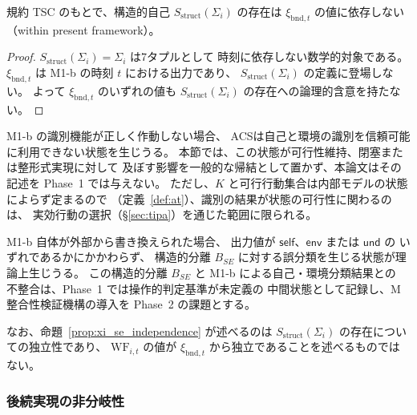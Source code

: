 \begin{proposition}
\label{prop:xi_se_independence}
規約 TSC のもとで、構造的自己
$S_{\mathrm{struct}}(\Sigma_i)$ の存在は
$\xi_{\mathrm{bnd},t}$ の値に依存しない
（within present framework）。
\end{proposition}

\begin{proof}
$S_{\mathrm{struct}}(\Sigma_i) = \Sigma_i$ は7タプルとして
時刻に依存しない数学的対象である。
$\xi_{\mathrm{bnd},t}$ は M1-b の時刻 $t$ における出力であり、
$S_{\mathrm{struct}}(\Sigma_i)$ の定義に登場しない。
よって $\xi_{\mathrm{bnd},t}$ のいずれの値も
$S_{\mathrm{struct}}(\Sigma_i)$ の存在への論理的含意を持たない。
\end{proof}

\begin{remark}[認知的識別の失敗と構造の独立性]
\label{rem:xi_se_interpretation}
M1-b の識別機能が正しく作動しない場合、
ACSは自己と環境の識別を信頼可能に利用できない状態を生じうる。
本節では、この状態が可行性維持、閉塞または整形式実現に対して
及ぼす影響を一般的な帰結として置かず、本論文はその記述を Phase~1 では与えない。
ただし、$K$ と可行行動集合は内部モデルの状態によらず定まるので
（定義~\ref{def:at}）、識別の結果が状態の可行性に関わるのは、
実効行動の選択（\S\ref{sec:tipa}）を通じた範囲に限られる。

M1-b 自体が外部から書き換えられた場合、
出力値が $\mathsf{self}$、$\mathsf{env}$ または $\mathsf{und}$ の
いずれであるかにかかわらず、
構造的分離 $B_{SE}$ に対する誤分類を生じる状態が理論上生じうる。
この構造的分離 $B_{SE}$ と M1-b による自己・環境分類結果との
不整合は、Phase~1 では操作的判定基準が未定義の
中間状態として記録し、M 整合性検証機構の導入を
Phase~2 の課題とする。

なお、命題~\ref{prop:xi_se_independence} が述べるのは
$S_{\mathrm{struct}}(\Sigma_i)$ の存在についての独立性であり、
$\mathrm{WF}_{i,t}$ の値が
$\xi_{\mathrm{bnd},t}$ から独立であることを述べるものではない。
\end{remark}

\subsubsection{後続実現の非分岐性}

